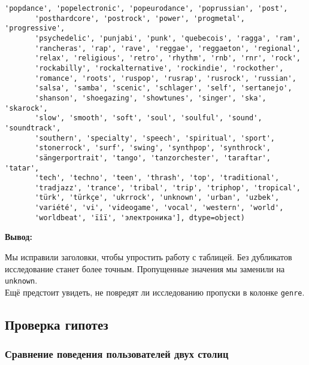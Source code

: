 \documentclass[11pt]{article}
\begin{document}
\begin{tcolorbox}[breakable, size=fbox, boxrule=.5pt, pad at break*=1mm, opacityfill=0]
\begin{Verbatim}[commandchars=\\\{\}]
       'popdance', 'popelectronic', 'popeurodance', 'poprussian', 'post',
       'posthardcore', 'postrock', 'power', 'progmetal', 'progressive',
       'psychedelic', 'punjabi', 'punk', 'quebecois', 'ragga', 'ram',
       'rancheras', 'rap', 'rave', 'reggae', 'reggaeton', 'regional',
       'relax', 'religious', 'retro', 'rhythm', 'rnb', 'rnr', 'rock',
       'rockabilly', 'rockalternative', 'rockindie', 'rockother',
       'romance', 'roots', 'ruspop', 'rusrap', 'rusrock', 'russian',
       'salsa', 'samba', 'scenic', 'schlager', 'self', 'sertanejo',
       'shanson', 'shoegazing', 'showtunes', 'singer', 'ska', 'skarock',
       'slow', 'smooth', 'soft', 'soul', 'soulful', 'sound', 'soundtrack',
       'southern', 'specialty', 'speech', 'spiritual', 'sport',
       'stonerrock', 'surf', 'swing', 'synthpop', 'synthrock',
       'sängerportrait', 'tango', 'tanzorchester', 'taraftar', 'tatar',
       'tech', 'techno', 'teen', 'thrash', 'top', 'traditional',
       'tradjazz', 'trance', 'tribal', 'trip', 'triphop', 'tropical',
       'türk', 'türkçe', 'ukrrock', 'unknown', 'urban', 'uzbek',
       'variété', 'vi', 'videogame', 'vocal', 'western', 'world',
       'worldbeat', 'ïîï', 'электроника'], dtype=object)
\end{Verbatim}
\end{tcolorbox}
        
    \textbf{Вывод:}

Мы исправили заголовки, чтобы упростить работу с таблицей. Без
дубликатов исследование станет более точным. Пропущенные значения мы
заменили на \texttt{\textquotesingle{}unknown\textquotesingle{}}.\\
Ещё предстоит увидеть, не повредят ли исследованию пропуски в колонке
\texttt{genre}.

    \hypertarget{ux43fux440ux43eux432ux435ux440ux43aux430-ux433ux438ux43fux43eux442ux435ux437}{%
\subsection{Проверка
гипотез}\label{ux43fux440ux43eux432ux435ux440ux43aux430-ux433ux438ux43fux43eux442ux435ux437}}

    \hypertarget{ux441ux440ux430ux432ux43dux435ux43dux438ux435-ux43fux43eux432ux435ux434ux435ux43dux438ux44f-ux43fux43eux43bux44cux437ux43eux432ux430ux442ux435ux43bux435ux439-ux434ux432ux443ux445-ux441ux442ux43eux43bux438ux446}{%
\subsubsection{Сравнение поведения пользователей двух
столиц}\label{ux441ux440ux430ux432ux43dux435ux43dux438ux435-ux43fux43eux432ux435ux434ux435ux43dux438ux44f-ux43fux43eux43bux44cux437ux43eux432ux430ux442ux435ux43bux435ux439-ux434ux432ux443ux445-ux441ux442ux43eux43bux438ux446}}
\end{document}
